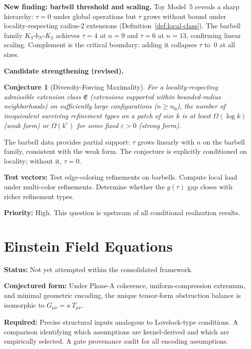 \documentclass[11pt,a4paper]{article}
\newtheorem{conjecture}[theorem]{Conjecture}
\theoremstyle{definition}
\theoremstyle{remark}
\begin{document}
\textbf{New finding: barbell threshold and scaling.} Toy Model~5 reveals a sharp hierarchy: $\tau = 0$ under global operations but $\tau$ grows without bound under locality-respecting radius-$2$ extensions (Definition~\ref{def:local-class}). The barbell family $K_3$-$b_N$-$K_3$ achieves $\tau = 4$ at $n = 9$ and $\tau = 6$ at $n = 13$, confirming linear scaling. Complement is the critical boundary: adding it collapses $\tau$ to~0 at all sizes.

\textbf{Candidate strengthening (revised).}

\begin{conjecture}[Diversity-Forcing Maximality]\label{conj:diversity}
For a locality-respecting admissible extension class $\mathfrak{E}$ (extensions supported within bounded-radius neighborhoods) on sufficiently large configurations ($n \geq n_0$), the number of inequivalent surviving refinement types on a patch of size $k$ is at least $\Omega(\log k)$ (weak form) or $\Omega(k^\varepsilon)$ for some fixed $\varepsilon > 0$ (strong form).
\end{conjecture}

The barbell data provides partial support: $\tau$ grows linearly with $n$ on the barbell family, consistent with the weak form. The conjecture is explicitly conditioned on locality; without it, $\tau = 0$.

\textbf{Test vectors:} Test edge-coloring refinements on barbells. Compute local load under multi-color refinements. Determine whether the $g(\tau)$ gap closes with richer refinement types.

\textbf{Priority:} High. This question is upstream of all conditional realization results.

\section{Einstein Field Equations}

\textbf{Status:} Not yet attempted within the consolidated framework.

\textbf{Conjectured form:} Under Phase-A coherence, uniform-compression extremum, and minimal geometric encoding, the unique tensor-form obstruction balance is isomorphic to $G_{\mu\nu} = \kappa\, T_{\mu\nu}$.

\textbf{Required:} Precise structural inputs analogous to Lovelock-type conditions. A comparison identifying which assumptions are kernel-derived and which are empirically selected. A gate provenance audit for all encoding assumptions.
\end{document}
